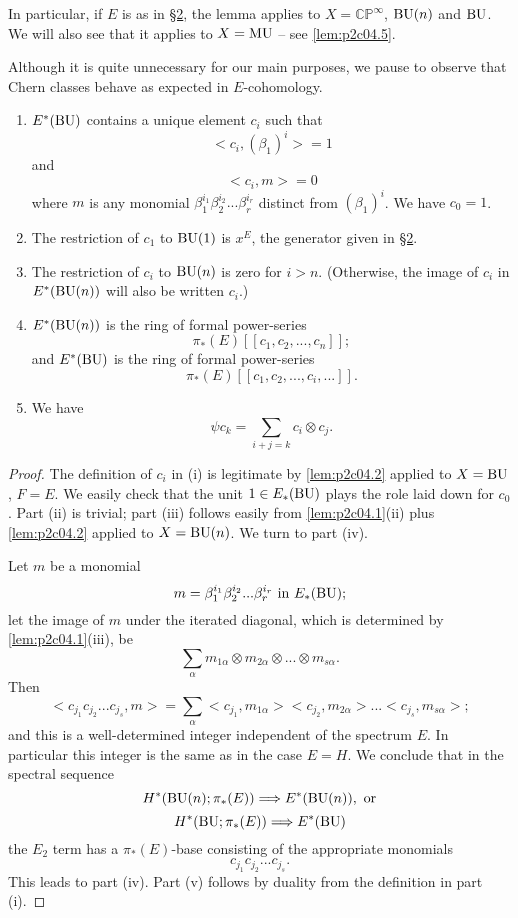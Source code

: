 \documentclass[../main]{subfiles}
\begin{document}
In particular, if $E$ is as in \hyperref[sec:p2c2]{\S 2}, the lemma applies to $X=\mathbb{CP}^\infty$, $\mathrm{BU}(n)$ and $\mathrm{BU}$. We will also see that it applies to $X=\mathrm{MU}$ -- see \eqref{lem:p2c04.5}.

Although it is quite unnecessary for our main purposes, we pause to observe that Chern classes behave as expected in $E$-cohomology.

\begin{lemma}
\label{lem:p2c04.3}
\begin{enumerate}
    \item $E^\ast(\mathrm{BU})$ contains a unique element $c_i$ such that 
    \[\big<c_i,(\beta_1)^i\big>=1\]
    and 
    \[\big<c_i,m\big>=0\]
    where $m$ is any monomial $\beta_1^{i_1}\beta_2^{i_2}...\beta_r^{i_r}$ distinct from $(\beta_1)^i$. We have $c_0=1$.
    \item The restriction of $c_1$ to $\mathrm{BU}(1)$ is $x^E$, the generator given in \hyperref[sec:p2c2]{\S 2}.
    \item The restriction of $c_i$ to $\mathrm{BU}(n)$ is zero for $i>n$. (Otherwise, the image of $c_i$ in $E^\ast(\mathrm{BU}(n))$ will also be written $c_i$.)
    \item $E^\ast(\mathrm{BU}(n))$ is the ring of formal power-series
    \[\pi_\ast(E)[[c_1,c_2,...,c_n]];\]
    and $E^\ast(\mathrm{BU})$ is the ring of formal power-series
    \[\pi_\ast(E)[[c_1,c_2,...,c_i,...]].\]
    \item We have
    \[\psi c_k=\sum_{i+j=k}c_i\otimes c_j.\]
\end{enumerate}
\end{lemma}
\begin{proof}
The definition of $c_i$ in (i) is legitimate by \eqref{lem:p2c04.2} applied to $X=\mathrm{BU}$, $F=E$. We easily check that the unit $1\in E_\ast(\mathrm{BU})$ plays the role laid down for $c_0$. Part (ii) is trivial; part (iii) follows easily from \eqref{lem:p2c04.1}(ii) plus \eqref{lem:p2c04.2} applied to $X=\mathrm{BU}(n)$. We turn to part (iv).

Let $m$ be a monomial
\[m=\beta_1^{i_1}\beta_2^{i_2}...\beta_r^{i_r} \text{ in } E_\ast(\mathrm{BU});\]
let the image of $m$ under the iterated diagonal, which is determined by \eqref{lem:p2c04.1}(iii), be 
\[\sum_\alpha m_{1\alpha}\otimes m_{2\alpha} \otimes ... \otimes m_{s\alpha}.\]
Then 
\[\big<c_{j_1}c_{j_2}...c_{j_s},m\big> = \sum_\alpha\big<c_{j_1},m_{1\alpha}\big>\big<c_{j_2},m_{2\alpha}\big>...\big<c_{j_s},m_{s\alpha}\big>;\]
and this is a well-determined integer independent of the spectrum $E$. In particular this integer is the same as in the case $E=H$. We conclude that in the spectral sequence
\[H^\ast(\mathrm{BU}(n);\pi_\ast(E))\Longrightarrow E^\ast(\mathrm{BU}(n)), \text{ or}\]
\[H^\ast(\mathrm{BU};\pi_\ast(E))\Longrightarrow E^\ast(\mathrm{BU})\]
the $E_2$ term has a $\pi_\ast(E)$-base consisting of the appropriate monomials 
\[c_{j_1}c_{j_2}...c_{j_s}.\]
This leads to part (iv). Part (v) follows by duality from the definition in part (i).
\end{proof}
\end{document}
